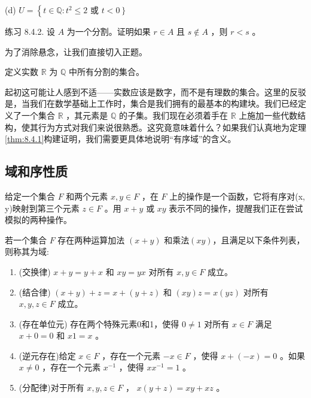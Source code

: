 (d) \(U = \left\{  {t \in  \mathbb{Q} : {t}^{2} \leq  2}\right.\) 或 \(\left. {t < 0}\right\}\)

练习 8.4.2. 设 \(A\) 为一个分割。证明如果 \(r \in  A\) 且 \(s \notin  A\) ，则 \(r < s\) 。

为了消除悬念，让我们直接切入正题。
\begin{Def}
  \label{def:8.4.3}
  定义实数 \(\mathbb{R}\) 为 \(\mathbb{Q}\) 中所有分割的集合。
\end{Def}

起初这可能让人感到不适——实数应该是数字，而不是有理数的集合。这里的反驳是，当我们在数学基础上工作时，集合是我们拥有的最基本的构建块。我们已经定义了一个集合 \(\mathbb{R}\) ，其元素是 \(\mathbb{Q}\) 的子集。我们现在必须着手在 \(\mathbb{R}\) 上施加一些代数结构，使其行为方式对我们来说很熟悉。这究竟意味着什么？如果我们认真地为定理\ref{thm:8.4.1}构建证明，我们需要更具体地说明“有序域”的含义。

\subsection{域和序性质}

给定一个集合 \(F\) 和两个元素 \(x,y \in  F\) ，在 \(F\) 上的操作是一个函数，它将有序对(x, y)映射到第三个元素 \(z \in  F\) 。用 \(x + y\) 或 \({xy}\) 表示不同的操作，提醒我们正在尝试模拟的两种操作。
\begin{Def}
  \label{def:8.4.4}
  若一个集合 \(F\) 存在两种运算加法 \(\left( {x + y}\right)\) 和乘法$(xy)$，且满足以下条件列表，则称其为域:
  \begin{enumerate}[label = (f\arabic*)]
  \item\label{item:8.4.11}  (交换律) \(x + y = y + x\) 和 \({xy} = {yx}\) 对所有 \(x,y \in  F\) 成立。

  \item\label{item:8.4.12}  (结合律) \(\left( {x + y}\right)  + z = x + \left( {y + z}\right)\) 和 \(\left( {xy}\right) z = x\left( {yz}\right)\) 对所有 \(x,y,z \in  F\) 成立。

  \item\label{item:8.4.13}  (存在单位元) 存在两个特殊元素0和1，使得 \(0 \neq  1\) 对所有 \(x \in  F\) 满足 \(x + 0 = 0\) 和 \({x1} = x\) 。

  \item\label{item:8.4.14} (逆元存在)给定 \(x \in  F\) ，存在一个元素 \(- x \in  F\) ，使得 \(x + \left( {-x}\right)  = 0\) 。如果 \(x \neq  0\) ，存在一个元素 \({x}^{-1}\) ，使得 \(x{x}^{-1} = 1\) 。

  \item\label{item:8.4.15} (分配律)对于所有 \(x,y,z \in  F\) ， \(x\left( {y + z}\right)  = {xy} + {xz}\) 。
  \end{enumerate}
\end{Def}

